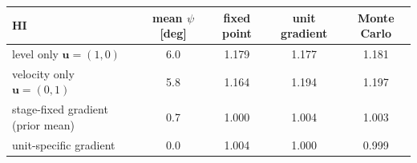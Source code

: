 \begin{tabular}{l c c c c}
\hline
HI & mean $\psi$ [deg] & fixed point & unit gradient & Monte Carlo \\
\hline
level only $\mathbf u=(1,0)$ & 6.0 & 1.179 & 1.177 & 1.181 \\
velocity only $\mathbf u=(0,1)$ & 5.8 & 1.164 & 1.194 & 1.197 \\
stage-fixed gradient (prior mean) & 0.7 & 1.000 & 1.004 & 1.003 \\
unit-specific gradient & 0.0 & 1.004 & 1.000 & 0.999 \\
\hline
\end{tabular}
